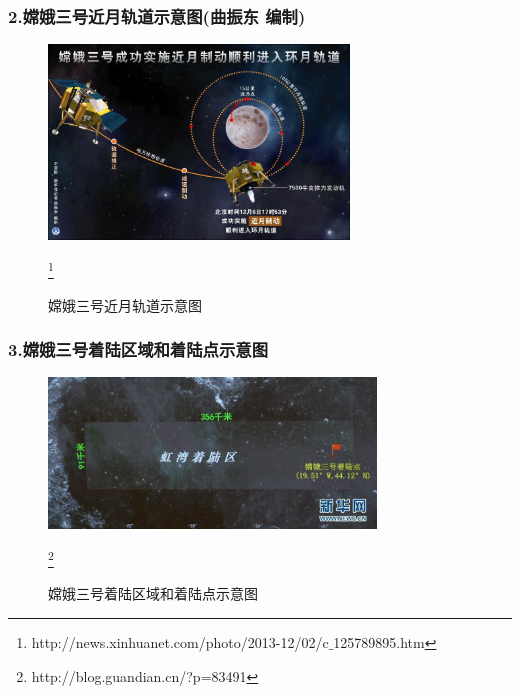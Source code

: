         \subsubsection{2.嫦娥三号近月轨道示意图(曲振东 编制)}
            \par
            \begin{figure}[H]
            \centering
            \includegraphics[width = 8cm]{images/near_track.png}
            \caption{嫦娥三号近月轨道示意图}\footnote{http://news.xinhuanet.com/photo/2013-12/02/c$\_$125789895.htm}
            \label{fig:嫦娥三号近月轨道示意图}
            \end{figure}
        \subsubsection{3.嫦娥三号着陆区域和着陆点示意图}
            \par
            \begin{figure}[H]
            \centering
            \includegraphics[height=4cm]{images/Landing_area_and_landing_point.jpg}
            \caption{嫦娥三号着陆区域和着陆点示意图}\footnote{http://blog.guandian.cn/?p=83491}
            \label{fig:嫦娥三号着陆区域和着陆点示意图}
            \end{figure}
